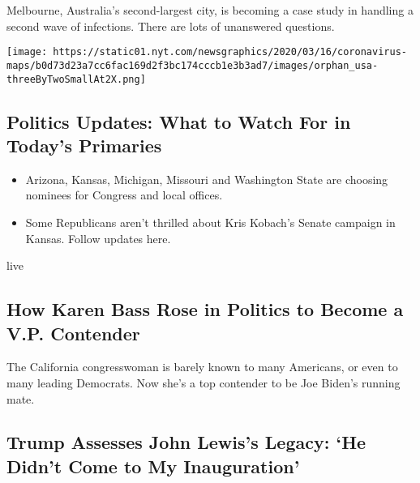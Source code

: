 Melbourne, Australia's second-largest city, is becoming a case study in
handling a second wave of infections. There are lots of unanswered
questions.

\texttt{[image: https://static01.nyt.com/newsgraphics/2020/03/16/coronavirus-maps/b0d73d23a7cc6fac169d2f3bc174cccb1e3b3ad7/images/orphan\_usa-threeByTwoSmallAt2X.png]}

\href{/2020/08/04/us/elections/primary-election-michigan-arizona-kansas.html}{}

\hypertarget{politics-updates-what-to-watch-for-in-todays-primaries}{%
\subsection{Politics Updates: What to Watch For in Today's
Primaries}\label{politics-updates-what-to-watch-for-in-todays-primaries}}

\begin{itemize}
\tightlist
\item
  Arizona, Kansas, Michigan, Missouri and Washington State are choosing
  nominees for Congress and local offices.
\item
  Some Republicans aren't thrilled about Kris Kobach's Senate campaign
  in Kansas. Follow updates here.
\end{itemize}

live

\href{/2020/08/04/us/politics/karen-bass-vice-president-biden.html}{}

\hypertarget{how-karen-bass-rose-in-politics-to-become-a-vp-contender}{%
\subsection{How Karen Bass Rose in Politics to Become a V.P.
Contender}\label{how-karen-bass-rose-in-politics-to-become-a-vp-contender}}

The California congresswoman is barely known to many Americans, or even
to many leading Democrats. Now she's a top contender to be Joe Biden's
running mate.

\href{/2020/08/04/us/politics/trump-john-lewis-axios.html}{}

\hypertarget{trump-assesses-john-lewiss-legacy-he-didnt-come-to-my-inauguration}{%
\subsection{Trump Assesses John Lewis's Legacy: `He Didn't Come to My
Inauguration'}\label{trump-assesses-john-lewiss-legacy-he-didnt-come-to-my-inauguration}}

